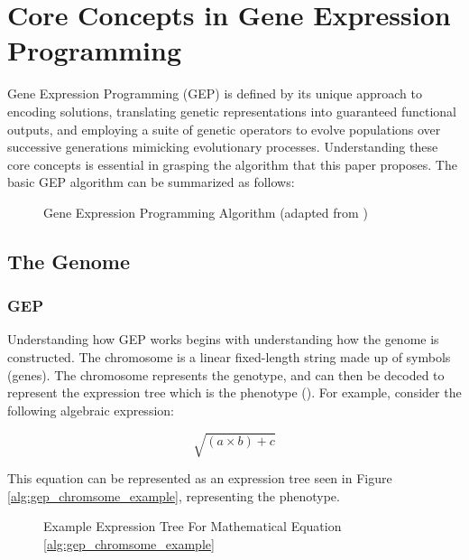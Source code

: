 \section{Core Concepts in Gene Expression Programming}\label{sec:gep_core_concepts}
Gene Expression Programming (GEP) is defined by its unique approach to encoding solutions, translating genetic representations into guaranteed functional outputs, and employing a suite of genetic operators to evolve populations over successive generations mimicking evolutionary processes. Understanding these core concepts is essential in grasping the algorithm that this paper proposes. The basic GEP algorithm can be summarized as follows:

\begin{figure}[H] %
	\centering %
	\caption{Gene Expression Programming Algorithm (adapted from \cite{ferreira2006gene})}
	\label{fig:gep_algorithm} %
\end{figure}


\subsection{The Genome}
\subsubsection{GEP}
Understanding how GEP works begins with understanding how the genome is constructed. The chromosome is a linear fixed-length string made up of symbols (genes). The chromosome represents the genotype, and can then be decoded to represent the expression tree which is the phenotype (\cite{ferreira2006gene}). For example, consider the following algebraic expression:

\begin{equation}\label{alg:gep_chromsome_example}
    \sqrt{(a \times b) + c}
\end{equation}

\noindent This equation can be represented as an expression tree seen in Figure \ref{alg:gep_chromsome_example}, representing the phenotype.

\begin{figure}[H] %
	\centering %
	\caption{Example Expression Tree For Mathematical Equation \ref{alg:gep_chromsome_example}}
	\label{fig:gep_phenotype_example} %
\end{figure}

